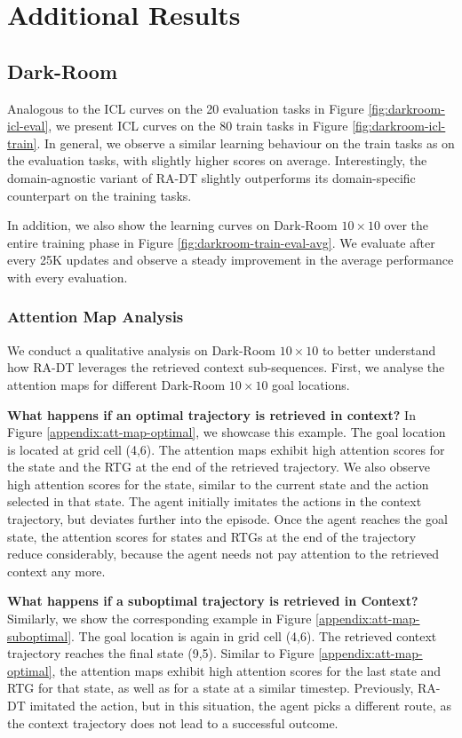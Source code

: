 \clearpage
\section{Additional Results}\label{appendix:results}
\subsection{Dark-Room}\label{appendix:expdetails-darkroom}
Analogous to the ICL curves on the 20 evaluation tasks in Figure \ref{fig:darkroom-icl-eval}, we present ICL curves on the 80 train tasks in Figure \ref{fig:darkroom-icl-train}. 
In general, we observe a similar learning behaviour on the train tasks as on the evaluation tasks, with slightly higher scores on average. 
Interestingly, the domain-agnostic variant of RA-DT slightly outperforms its domain-specific counterpart on the training tasks. 

In addition, we also show the learning curves on Dark-Room $10\times 10$ over the entire training phase in Figure \ref{fig:darkroom-train-eval-avg}. 
We evaluate after every 25K updates and observe a steady improvement in the average performance with every evaluation.  

\subsubsection{Attention Map Analysis}\label{appendix:attn-maps}
We conduct a qualitative analysis on Dark-Room $10\times10$ to better understand how RA-DT leverages the retrieved context sub-sequences. 
First, we analyse the attention maps for different Dark-Room $10\times10$ goal locations.

\textbf{What happens if an optimal trajectory is retrieved in context? }
In Figure \ref{appendix:att-map-optimal}, we showcase this example. 
The goal location is located at grid cell (4,6).
The attention maps exhibit high attention scores for the state and the RTG at the end of the retrieved trajectory.
We also observe high attention scores for the state, similar to the current state and the action selected in that state. 
The agent initially imitates the actions in the context trajectory, but deviates further into the episode. 
Once the agent reaches the goal state, the attention scores for states and RTGs at the end of the trajectory reduce considerably, because the agent needs not pay attention to the retrieved context any more.


\textbf{What happens if a suboptimal trajectory is retrieved in Context?}
Similarly, we show the corresponding example in Figure \ref{appendix:att-map-suboptimal}.
The goal location is again in grid cell (4,6). 
The retrieved context trajectory reaches the final state (9,5).
Similar to Figure \ref{appendix:att-map-optimal}, the attention maps exhibit high attention scores for the last state and RTG for that state, as well as for a state at a similar timestep.
Previously, RA-DT imitated the action, but in this situation, the agent
picks a different route, as the context trajectory does not lead to a successful outcome. 

